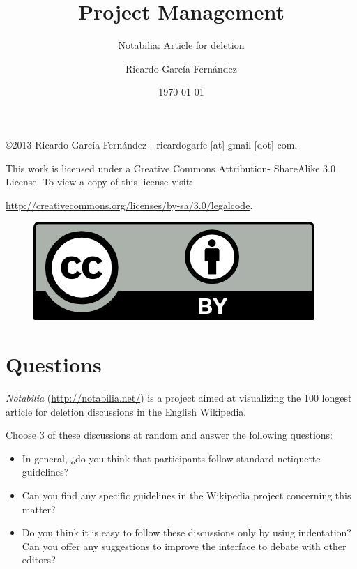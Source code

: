 \documentclass[11pt]{scrartcl}
\title{\textbf{Project Management}}
\subtitle{Notabilia: Article for deletion}
\author{Ricardo Garc\'ia Fern\'andez}
\date{\today}
\begin{document}
\maketitle

\vfill

\begin{flushright}
    \copyright  2013 Ricardo Garc\'ia Fern\'andez - ricardogarfe [at] gmail [dot] com.

    This work is licensed under a Creative Commons Attribution- ShareAlike 3.0 License.
    To view a copy of this license visit:
 
    \url{http://creativecommons.org/licenses/by-sa/3.0/legalcode}.
\end{flushright}

\begin{figure}[h]
    \begin{flushright}	
        \includegraphics{by}
        \label{fig:by-sa}
    \end{flushright}
\end{figure}

\newpage

\section{Questions}

\par \emph{Notabilia} (\url{http://notabilia.net/}) is a project aimed at visualizing the 100 longest article for deletion discussions in the English Wikipedia.

\par Choose 3 of these discussions at random and answer the following questions:

\begin{itemize}
	\item In general, ¿do you think that participants follow standard netiquette guidelines?
	\item Can you find any specific guidelines in the Wikipedia project concerning this matter?
	\item Do you think it is easy to follow these discussions only by using indentation? Can you offer any suggestions to improve the interface to debate with other editors?
\end{itemize}
\end{document}
